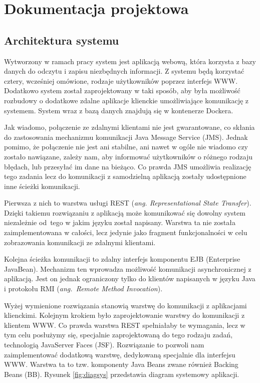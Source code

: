 \chapter{Dokumentacja projektowa}

\section{Architektura systemu}
Wytworzony w ramach pracy system jest aplikacją webową, która korzysta z bazy danych do odczytu i zapisu niezbędnych informacji. Z systemu będą korzystać cztery, wcześniej omówione, rodzaje użytkowników poprzez interfejs WWW. Dodatkowo system został zaprojektowany w taki sposób, aby była możliwość rozbudowy o dodatkowe zdalne aplikacje klienckie umożliwiające komunikację z systemem. System wraz z bazą danych znajdują się w kontenerze Dockera.

Jak wiadomo, połączenie ze zdalnymi klientami nie jest gwarantowane, co skłania do zastosowania mechanizmu komunikacji Java Message Service (JMS). Jednak pomimo, że połączenie nie jest ani stabilne, ani nawet w ogóle nie wiadomo czy zostało nawiązane, zależy nam, aby informować użytkowników o różnego rodzaju błędach, lub przesyłać im dane na bieżąco. Co prawda JMS umożliwia realizację tego zadania lecz do komunikacji z samodzielną aplikacją zostały udostępnione inne ścieżki komunikacji. 

Pierwsza z nich to warstwa usługi REST (\textit{ang. Representational State Transfer}). Dzięki takiemu rozwiązaniu z aplikacją może komunikować się dowolny system niezależnie od~tego w jakim języku został napisany. Warstwa ta nie została zaimplementowana w całości, lecz jedynie jako fragment funkcjonalności w celu zobrazowania komunikacji ze zdalnymi klientami.

Kolejna ścieżka komunikacji to zdalny interfejs komponentu EJB (Enterprise JavaBean). Mechanizm ten wprowadza możliwość komunikacji asynchronicznej z aplikacją. Jest on jednak ograniczony tylko do klientów napisanych w języku Java i protokołu RMI (\textit{ang.~Remote Method Invocation}).

Wyżej wymienione rozwiązania stanowią warstwę do komunikacji z aplikacjami klienckimi. Kolejnym krokiem było zaprojektowanie warstwy do komunikacji z klientem WWW. Co prawda warstwa REST spełniałaby te wymagania, lecz w tym celu posłużymy się, specjalnie zaprojektowaną do tego rodzaju zadań, technologią JavaServer Faces (JSF). Rozwiązanie to pozwoli nam zaimplementować dodatkową warstwę, dedykowaną specjalnie dla interfejsu WWW. Warstwa ta to tzw. komponenty Java Beans zwane również Backing Beans (BB). Rysunek \ref{fig:diagsys} przedstawia diagram systemowy aplikacji.

